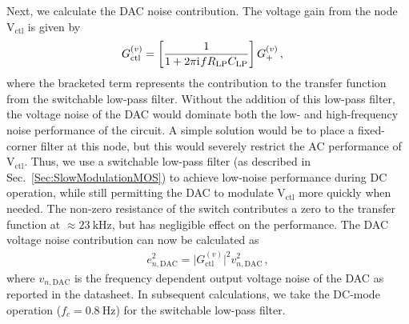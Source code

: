 \documentclass[aip,rsi,reprint]{revtex4-1} %
\newcommand{\iu}{\mathrm{i}\mkern1mu}
\begin{document}
Next, we calculate the DAC noise contribution.
The voltage gain from the node $\text{V}_{\text{ctl}}$ is given by
\begin{align}
\label{Eq:Gdc}
G^{(v)}_{\text{ctl}} &= \left[\frac{1}{1+2\pi \iu f R_\text{LP} C_\text{LP}}\right]G_{+}^{(v)}\,,
\end{align}
where the bracketed term represents the contribution to the transfer function from the switchable low-pass filter.
Without the addition of this low-pass filter, the voltage noise of the DAC would dominate both the low- and high-frequency noise performance of the circuit.
A simple solution would be to place a fixed-corner filter at this node, but this would severely restrict the AC performance of $\text{V}_\text{ctl}$.
Thus, we use a switchable low-pass filter (as described in Sec.~\ref{Sec:SlowModulationMOS}) to achieve low-noise performance during DC operation, while still permitting the DAC to modulate $\text{V}_\text{ctl}$ more quickly when needed.
The non-zero resistance of the switch contributes a zero to the transfer function at $\approx\SI{23}{\kilo\hertz}$, but has negligible effect on the performance.
The DAC voltage noise contribution can now be calculated as 
\begin{align}
e^2_{n,\text{DAC}} = \big|G^{(v)}_{\text{ctl}}\big|^2 v^2_{n,\text{DAC}}\,,
\end{align}
where $v_{n,\text{DAC}}$ is the frequency dependent output voltage noise of the DAC as reported in the datasheet.\cite{AD56XXRDatasheet} 
In subsequent calculations, we take the DC-mode operation ($f_c = \SI{0.8}{\hertz}$) for the switchable low-pass filter.
 
\end{document}

